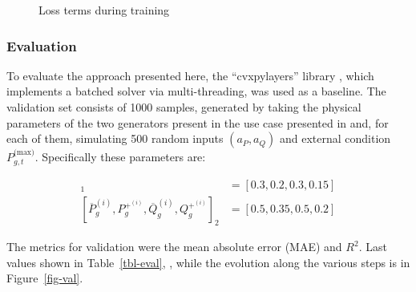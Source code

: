 \documentclass[
]{article}
\begin{document}
\begin{figure}


\caption{\label{fig-training}Loss terms during training}

\end{figure}%

\subsubsection{Evaluation}\label{evaluation}

To evaluate the approach presented here, the ``cvxpylayers'' library
\autocite{agrawalDifferentiableConvexOptimization2019a}, which
implements a batched solver via multi-threading, was used as a baseline.
The validation set consists of 1000 samples, generated by taking the
physical parameters of the two generators present in the use case
presented in and, for each of them, simulating 500 random inputs
\((a_P, a_Q)\) and external condition \(P^{\textrm{(max)}}_{g,t}\).
Specifically these parameters are:

\begin{align}
    [\overline{P}_g^{(i)},  P_g^{+^{(i)}}, \overline{Q}_g^{(i)},  Q_g^{+^{(i)}}]_1 &= [0.3, 0.2, 0.3, 0.15]\\
    [\overline{P}_g^{(i)},  P_g^{+^{(i)}}, \overline{Q}_g^{(i)},  Q_g^{+^{(i)}}]_2 &= [0.5, 0.35, 0.5, 0.2]
\end{align}

The metrics for validation were the mean absolute error (MAE) and
\(R^2\). Last values shown in Table~\ref{tbl-eval}, , while the
evolution along the various steps is in Figure~\ref{fig-val}.
\end{document}
